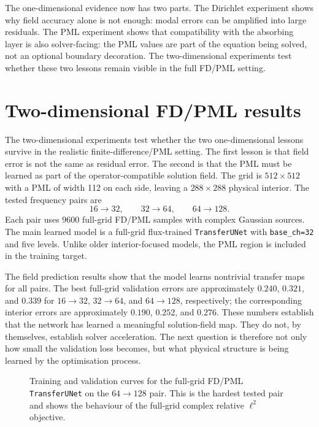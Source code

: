 The one-dimensional evidence now has two parts. The Dirichlet experiment shows
why field accuracy alone is not enough: modal errors can be amplified into
large residuals. The PML experiment shows that compatibility with the
absorbing layer is also solver-facing: the PML values are part of the equation
being solved, not an optional boundary decoration. The two-dimensional
experiments test whether these two lessons remain visible in the full FD/PML
setting.

\section{Two-dimensional FD/PML results}
\label{sec:results-2d}

The two-dimensional experiments test whether the two one-dimensional lessons
survive in the realistic finite-difference/PML setting. The first lesson is
that field error is not the same as residual error. The second is that the PML
must be learned as part of the operator-compatible solution field. The grid is
$512\times512$ with a PML of width 112 on each side, leaving a
$288\times288$ physical interior. The tested frequency pairs are
\[
    16\to32,
    \qquad
    32\to64,
    \qquad
    64\to128.
\]
Each pair uses $9600$ full-grid FD/PML samples with complex Gaussian sources.
The main learned model is a full-grid flux-trained \texttt{TransferUNet} with
\texttt{base\_ch=32} and five levels. Unlike older interior-focused models,
the PML region is included in the training target.

The field prediction results show that the model learns nontrivial transfer
maps for all pairs. The best full-grid validation errors are approximately
$0.240$, $0.321$, and $0.339$ for $16\to32$, $32\to64$, and $64\to128$,
respectively; the corresponding interior errors are approximately $0.190$,
$0.252$, and $0.276$. These numbers establish that the network has learned a
meaningful solution-field map. They do not, by themselves, establish solver
acceleration. The next question is therefore not only how small the validation
loss becomes, but what physical structure is being learned by the optimisation
process.

\begin{figure}[htbp]
    \centering
    \caption{Training and validation curves for the full-grid FD/PML
    \texttt{TransferUNet} on the $64\to128$ pair. This is the hardest tested
    pair and shows the behaviour of the full-grid complex relative $\ell^2$
    objective.}
    \label{fig:results-2d-training-64-128}
\end{figure}

